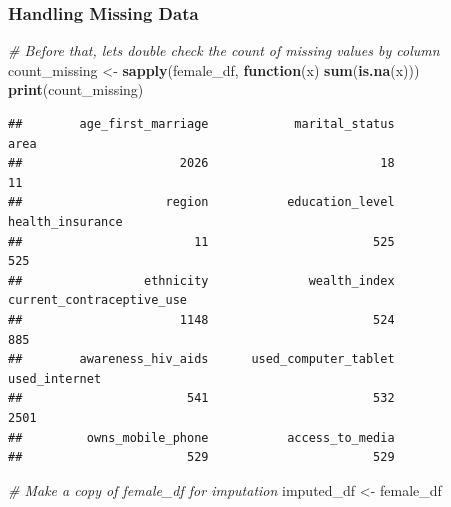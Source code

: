 \documentclass[
]{article}
\newenvironment{Shaded}{\begin{snugshade}}{\end{snugshade}}
\newcommand{\CommentTok}[1]{\textcolor[rgb]{0.56,0.35,0.01}{\textit{#1}}}
\newcommand{\ControlFlowTok}[1]{\textcolor[rgb]{0.13,0.29,0.53}{\textbf{#1}}}
\newcommand{\FunctionTok}[1]{\textcolor[rgb]{0.13,0.29,0.53}{\textbf{#1}}}
\newcommand{\NormalTok}[1]{#1}
\newcommand{\OtherTok}[1]{\textcolor[rgb]{0.56,0.35,0.01}{#1}}
\begin{document}
\hypertarget{handling-missing-data}{%
\subsubsection{Handling Missing Data}\label{handling-missing-data}}

\begin{Shaded}
\begin{Highlighting}[]
\CommentTok{\# Before that, let\textquotesingle{}s double check the count of missing values by column}
\NormalTok{count\_missing }\OtherTok{\textless{}{-}} \FunctionTok{sapply}\NormalTok{(female\_df, }\ControlFlowTok{function}\NormalTok{(x) }\FunctionTok{sum}\NormalTok{(}\FunctionTok{is.na}\NormalTok{(x)))}
\FunctionTok{print}\NormalTok{(count\_missing)}
\end{Highlighting}
\end{Shaded}

\begin{verbatim}
##        age_first_marriage            marital_status                      area 
##                      2026                        18                        11 
##                    region           education_level          health_insurance 
##                        11                       525                       525 
##                 ethnicity              wealth_index current_contraceptive_use 
##                      1148                       524                       885 
##        awareness_hiv_aids      used_computer_tablet             used_internet 
##                       541                       532                      2501 
##         owns_mobile_phone           access_to_media 
##                       529                       529
\end{verbatim}

\begin{Shaded}
\begin{Highlighting}[]
\CommentTok{\# Make a copy of female\_df for imputation}
\NormalTok{imputed\_df }\OtherTok{\textless{}{-}}\NormalTok{ female\_df}
\end{Highlighting}
\end{Shaded}
\end{document}
